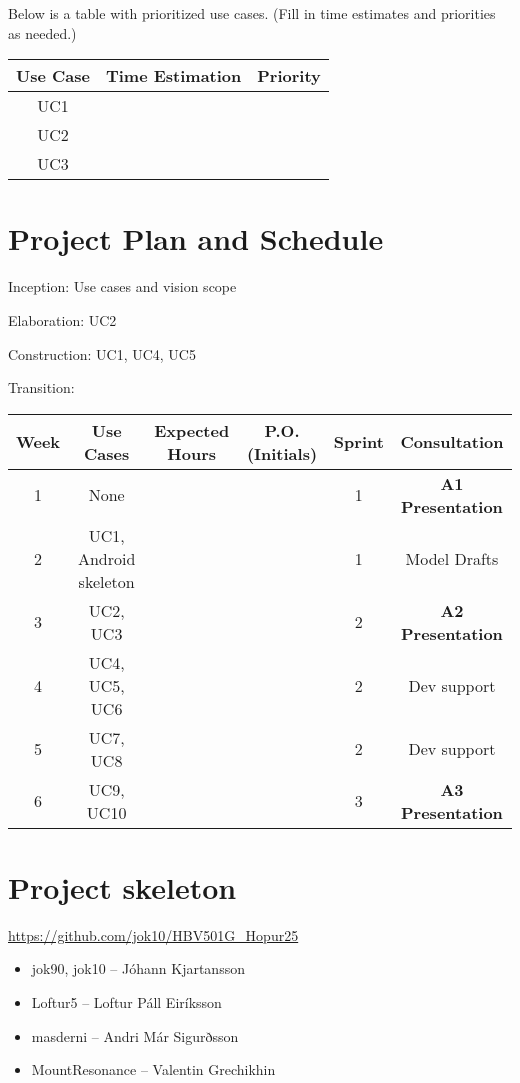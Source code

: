 \documentclass{article}
\begin{document}
Below is a table with prioritized use cases. (Fill in time estimates and priorities as needed.)

\begin{table}[h]
  \centering
  \begin{tabular}{|c|c|c|}
    \hline
    Use Case & Time Estimation & Priority \\ \hline
    UC1 &  &  \\ \hline
    UC2 &  &  \\ \hline
    UC3 &  &  \\ \hline
  \end{tabular}
\end{table}

\section{Project Plan and Schedule}

Inception: Use cases and vision scope

Elaboration: UC2

Construction: UC1, UC4, UC5

Transition:

\begin{longtable}{|c|c|c|c|c|c|}
    \hline
    \textbf{Week} & \textbf{Use Cases} & \textbf{Expected Hours} & \textbf{P.O. (Initials)} & \textbf{Sprint} & \textbf{Consultation} \\
    \hline
    1 & None &  &  & 1 & \textbf{A1 Presentation} \\
    \hline
    2 & UC1, Android skeleton &  &  & 1 & Model Drafts \\
    \hline
    3 & UC2, UC3 &  &  & 2 & \textbf{A2 Presentation} \\
    \hline
    4 & UC4, UC5, UC6 &  &  & 2 & Dev support \\
    \hline
    5 & UC7, UC8 &  &  & 2 & Dev support \\
    \hline
    6 & UC9, UC10 &  &  & 3 & \textbf{A3 Presentation} \\
    \hline
\end{longtable}


\section{Project skeleton}


\url{https://github.com/jok10/HBV501G_Hopur25}

\begin{itemize}
  \item jok90, jok10 -- Jóhann Kjartansson
  \item Loftur5 -- Loftur Páll Eiríksson
  \item masderni -- Andri Már Sigurðsson
  \item MountResonance -- Valentin Grechikhin
\end{itemize}
\end{document}
